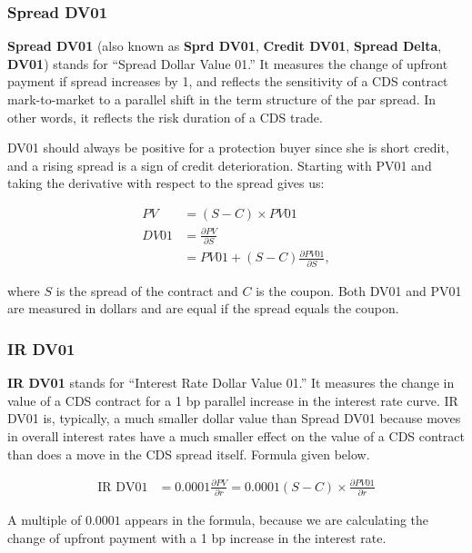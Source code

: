 \documentclass{jss}
\begin{document}
\subsubsection{Spread DV01}
\label{sec:spread.DV.01}

\textbf{Spread DV01} (also known as \textbf{Sprd DV01}, \textbf{Credit DV01}, \textbf{Spread Delta}, \textbf{DV01}) stands for ``Spread Dollar Value 01.'' It measures the change of upfront payment if spread increases by 1, and reflects the sensitivity of a CDS contract mark-to-market to a parallel shift in the term structure of the par spread. In other words, it reflects the risk duration of a CDS trade. 

DV01 should always be positive for a protection buyer since she is short credit, and a rising spread is a sign of credit deterioration. Starting with PV01 and taking the derivative with respect to the spread gives us:

\begin{align*}
  PV &= (S - C) \times PV01 \\
  DV01 &= \frac{\partial PV}{\partial S} \\
  &= PV01 + (S - C) \frac{\partial PV01}{\partial S},
\end{align*}

where $S$ is the spread of the contract and $C$ is the coupon. Both DV01 and PV01 are measured in dollars and are equal if the spread equals the coupon.

\subsubsection{IR DV01}
\label{sec:IRDV01}
\textbf{IR DV01} stands for ``Interest Rate Dollar Value 01.'' It measures the change in value of a CDS contract for a 1 bp parallel increase in the interest rate curve. IR DV01 is, typically, a much smaller dollar value than Spread DV01 because moves in overall interest rates have a much smaller effect on the value of a CDS contract than does a move in the CDS spread itself. Formula given below.

\begin{align*}
  \text{IR DV01} &= 0.0001 \frac{\partial PV}{\partial r} = 0.0001 (S - C) \times \frac{\partial PV01}{\partial r}
\end{align*}

A multiple of $0.0001$ appears in the formula, because we are calculating the change of upfront payment with a 1 bp increase in the interest rate.
\end{document}
